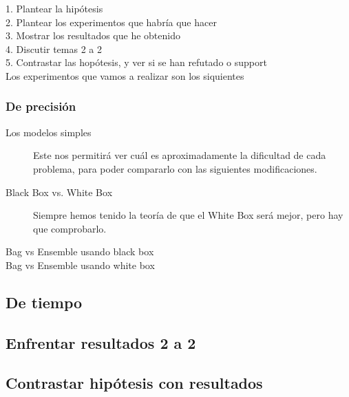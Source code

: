 1. Plantear la hipótesis \\
2. Plantear los experimentos que habría que hacer \\
3. Mostrar los resultados que he obtenido \\
4. Discutir temas 2 a 2 \\
5. Contrastar las hopótesis, y ver si se han refutado o support \\




Los experimentos que vamos a realizar son los siquientes
  \subsubsection{De precisión}
  \begin{description}
    \item[Los modelos simples] Este nos permitirá ver cuál es aproximadamente
    la dificultad de cada problema, para poder compararlo con las siguientes
    modificaciones.
    \item[Black Box vs. White Box] Siempre hemos tenido la teoría de que el
    White Box será mejor, pero hay que comprobarlo.
    \item[Bag vs Ensemble usando black box]
    \item[Bag vs Ensemble usando white box]
  \end{description}
  \subsection{De tiempo}




\subsection{Enfrentar resultados 2 a 2}
\subsection{Contrastar hipótesis con resultados}
